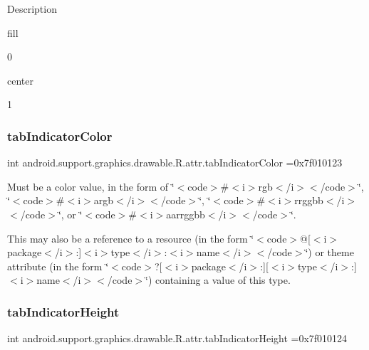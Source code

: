 Description 

{\ttfamily fill}

0

{\ttfamily center}

1\mbox{\label{classandroid_1_1support_1_1graphics_1_1drawable_1_1R_1_1attr_adad270cd3bde3f88c4601faeebbfdcd3}} 
\subsubsection{\texorpdfstring{tab\+Indicator\+Color}{tabIndicatorColor}}
{\footnotesize\ttfamily int android.\+support.\+graphics.\+drawable.\+R.\+attr.\+tab\+Indicator\+Color =0x7f010123\hspace{0.3cm}{\ttfamily [static]}}

Must be a color value, in the form of \char`\"{}$<$code$>$\#$<$i$>$rgb$<$/i$>$$<$/code$>$\char`\"{}, \char`\"{}$<$code$>$\#$<$i$>$argb$<$/i$>$$<$/code$>$\char`\"{}, \char`\"{}$<$code$>$\#$<$i$>$rrggbb$<$/i$>$$<$/code$>$\char`\"{}, or \char`\"{}$<$code$>$\#$<$i$>$aarrggbb$<$/i$>$$<$/code$>$\char`\"{}. 

This may also be a reference to a resource (in the form \char`\"{}$<$code$>$@\mbox{[}$<$i$>$package$<$/i$>$\+:\mbox{]}$<$i$>$type$<$/i$>$\+:$<$i$>$name$<$/i$>$$<$/code$>$\char`\"{}) or theme attribute (in the form \char`\"{}$<$code$>$?\mbox{[}$<$i$>$package$<$/i$>$\+:\mbox{]}\mbox{[}$<$i$>$type$<$/i$>$\+:\mbox{]}$<$i$>$name$<$/i$>$$<$/code$>$\char`\"{}) containing a value of this type. \mbox{\label{classandroid_1_1support_1_1graphics_1_1drawable_1_1R_1_1attr_aaa97736be3c5d43414aa1b4b944a60cb}} 
\subsubsection{\texorpdfstring{tab\+Indicator\+Height}{tabIndicatorHeight}}
{\footnotesize\ttfamily int android.\+support.\+graphics.\+drawable.\+R.\+attr.\+tab\+Indicator\+Height =0x7f010124\hspace{0.3cm}{\ttfamily [static]}}

